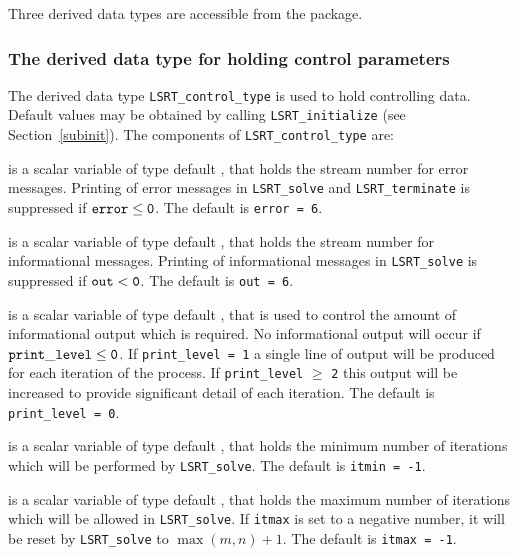\documentclass{galahad}
\newcommand{\packagename}{LS\-RT}
\begin{document}

\galtypes
Three derived data types are accessible from the package.


\subsubsection{The derived data type for holding control 
 parameters}\label{typecontrol}
The derived data type 
{\tt \packagename\_control\_type} 
is used to hold controlling data. Default values may be obtained by calling 
{\tt \packagename\_initialize}
(see Section~\ref{subinit}). The components of 
{\tt \packagename\_control\_type} 
are:

\begin{description}
 is a scalar variable of type default \integer, that holds the 
stream number for error messages. 
Printing of error messages in  
{\tt \packagename\_solve} and {\tt \packagename\_terminate} 
is suppressed if ${\tt error} \leq {\tt 0}$. 
The default is {\tt error = 6}.
 
 is a scalar variable of type default \integer, that holds the 
stream number for informational messages. 
Printing of informational messages in  
{\tt \packagename\_solve} is suppressed if ${\tt out} < {\tt 0}$. 
The default is {\tt out = 6}.
 
 is a scalar variable of type default \integer, 
that is used 
to control the amount of informational output which is required. No  
informational output will occur if ${\tt print\_level} \leq {\tt 0}$. If  
{\tt print\_level = 1} a single line of output will be produced for each 
iteration of the process. If {\tt print\_level} $\geq$ {\tt 2} this output 
will be increased to provide significant detail of each iteration. 
The default is {\tt print\_level = 0}.
 
 is a scalar variable of type default \integer, that holds the 
minimum number of iterations which will be performed by
{\tt \packagename\_solve}. 
The default is {\tt itmin = -1}.
 
 is a scalar variable of type default \integer, that holds the 
maximum number of iterations which will be allowed in 
{\tt \packagename\_solve}. 
If {\tt itmax} is set to a negative number, it will be reset by  
{\tt \packagename\_solve} to $\max(m,n)+1$. 
The default is {\tt itmax = -1}.
 

\end{description}
\end{document}
